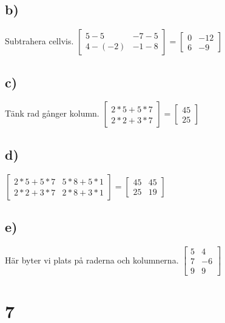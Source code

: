 \documentclass{article}
\begin{document}
\subsection*{b)}
Subtrahera cellvis.
$ 
    			\begin{bmatrix}
    			5-5 & -7-5 \\
    			4-(-2) & -1-8
    			\end{bmatrix}
    			=
    			\begin{bmatrix}
    			0 & -12 \\
    			6  & -9
    			\end{bmatrix}
    			$
    			
\subsection*{c)}
Tänk rad gånger kolumn.
$ 
    			\begin{bmatrix}
    			2*5+5*7  \\
    			2*2+3*7
    			\end{bmatrix}
    			=
    			\begin{bmatrix}
    			45  \\
    			25
    			\end{bmatrix}
    			$

\subsection*{d)}

$ 
    			\begin{bmatrix}
    			2*5+5*7 & 5*8+5*1  \\
    			2*2+3*7 & 2*8+3*1
    			\end{bmatrix}
    			=
    			\begin{bmatrix}
    			45 & 45\\
    			25 & 19
    			\end{bmatrix}
    			$

\subsection*{e)}
Här byter vi plats på raderna och kolumnerna.
				$ 
    			\begin{bmatrix}
    			5 & 4 \\
    			7 & -6 \\
    			9 & 9 
    			\end{bmatrix}
    			$
    			
    			
\section*{7}
\end{document}
